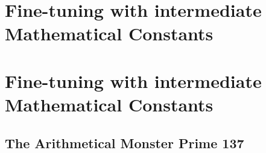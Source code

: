 \chapter{Fine-tuning with intermediate Mathematical Constants}
\label{chap:chapter_2}

\chapter{Fine-tuning with intermediate Mathematical Constants}
\section {The Arithmetical Monster Prime 137}

